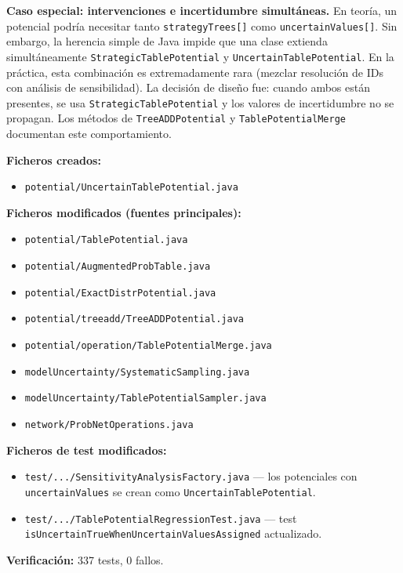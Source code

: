\documentclass[11pt,a4paper]{article}
\newcommand{\code}[1]{\texttt{#1}}
\begin{document}
\textbf{Caso especial: intervenciones e incertidumbre simultáneas.}
En teoría, un potencial podría necesitar tanto \code{strategyTrees[]} como
\code{uncertainValues[]}.  Sin embargo, la herencia simple de Java impide que
una clase extienda simultáneamente \code{StrategicTablePotential} y
\code{UncertainTablePotential}.  En la práctica, esta combinación es
extremadamente rara (mezclar resolución de IDs con análisis de sensibilidad).
La decisión de diseño fue: cuando ambos están presentes, se usa
\code{StrategicTablePotential} y los valores de incertidumbre no se propagan.
Los métodos de \code{TreeADDPotential} y \code{TablePotentialMerge} documentan
este comportamiento.

\textbf{Ficheros creados:}
\begin{itemize}
  \item \code{potential/UncertainTablePotential.java}
\end{itemize}

\textbf{Ficheros modificados (fuentes principales):}
\begin{itemize}
  \item \code{potential/TablePotential.java}
  \item \code{potential/AugmentedProbTable.java}
  \item \code{potential/ExactDistrPotential.java}
  \item \code{potential/treeadd/TreeADDPotential.java}
  \item \code{potential/operation/TablePotentialMerge.java}
  \item \code{modelUncertainty/SystematicSampling.java}
  \item \code{modelUncertainty/TablePotentialSampler.java}
  \item \code{network/ProbNetOperations.java}
\end{itemize}

\textbf{Ficheros de test modificados:}
\begin{itemize}
  \item \code{test/.../SensitivityAnalysisFactory.java} --- los
        potenciales con \code{uncertainValues} se crean como
        \code{UncertainTablePotential}.
  \item \code{test/.../TablePotentialRegressionTest.java} --- test
        \code{is\-Uncertain\-True\-When\-Uncertain\-Values\-Assigned} actualizado.
\end{itemize}

\textbf{Verificación:} 337 tests, 0 fallos.
\end{document}
